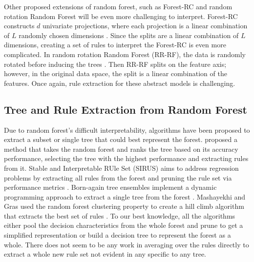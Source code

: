 \documentclass[11pt]{article}
\begin{document}
Other proposed extensions of random forest, such as Forest-RC and random rotation Random Forest will be even more challenging to interpret. Forest-RC constructs $d$ univariate projections, where each projection is a linear combination of $L$ randomly chosen dimensions \citep{breiman2001random}. Since the splits are a linear combination of $L$ dimensions, creating a set of rules to interpret the Forest-RC is even more complicated. In random rotation Random Forest (RR-RF), the data is randomly rotated before inducing the trees \citep{blaser2016random}. Then RR-RF splits on the feature axis; however, in the original data space, the split is a linear combination of the features. Once again, rule extraction for these abstract models is challenging. 


\subsection{Tree and Rule Extraction from Random Forest}
Due to random forest's difficult interpretability, algorithms have been proposed to extract a subset or single tree that could best represent the forest. \cite{boruah2022transparent} proposed a method that takes the random forest and ranks the tree based on its accuracy performance, selecting the tree with the highest performance and extracting rules from it. Stable and Interpretable RUle Set (SIRUS) aims to address regression problems by extracting all rules from the forest and pruning the rule set via performance metrics \citep{benard2021interpretable}. Born-again tree ensembles implement a dynamic programming approach to extract a single tree from the forest \citep{vidal2020born}. Mashayekhi and Gras used the random forest clustering property to create a hill climb algorithm that extracts the best set of rules \citep{mashayekhi2015rule}. To our best knowledge, all the algorithms either pool the decision characteristics from the whole forest and prune to get a simplified representation or build a decision tree to represent the forest as a whole. There does not seem to be any work in averaging over the rules directly to extract a whole new rule set not evident in any specific to any tree.
\end{document}
